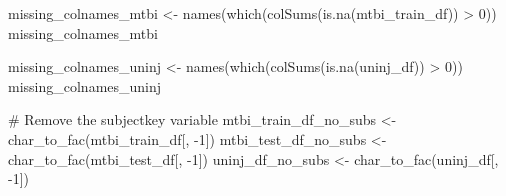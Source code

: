 \documentclass[
  letterpaper,
  DIV=11,
  numbers=noendperiod]{scrreprt}
\newenvironment{Shaded}{\begin{snugshade}}{\end{snugshade}}
\newcommand{\CommentTok}[1]{\textcolor[rgb]{0.37,0.37,0.37}{#1}}
\newcommand{\DecValTok}[1]{\textcolor[rgb]{0.68,0.00,0.00}{#1}}
\newcommand{\FunctionTok}[1]{\textcolor[rgb]{0.28,0.35,0.67}{#1}}
\newcommand{\NormalTok}[1]{\textcolor[rgb]{0.00,0.23,0.31}{#1}}
\newcommand{\OtherTok}[1]{\textcolor[rgb]{0.00,0.23,0.31}{#1}}
\newcommand{\SpecialCharTok}[1]{\textcolor[rgb]{0.37,0.37,0.37}{#1}}
\begin{document}
\begin{Shaded}
\begin{Highlighting}[]
\NormalTok{missing\_colnames\_mtbi }\OtherTok{\textless{}{-}} \FunctionTok{names}\NormalTok{(}\FunctionTok{which}\NormalTok{(}\FunctionTok{colSums}\NormalTok{(}\FunctionTok{is.na}\NormalTok{(mtbi\_train\_df)) }\SpecialCharTok{\textgreater{}} \DecValTok{0}\NormalTok{))}
\NormalTok{missing\_colnames\_mtbi}

\NormalTok{missing\_colnames\_uninj }\OtherTok{\textless{}{-}} \FunctionTok{names}\NormalTok{(}\FunctionTok{which}\NormalTok{(}\FunctionTok{colSums}\NormalTok{(}\FunctionTok{is.na}\NormalTok{(uninj\_df)) }\SpecialCharTok{\textgreater{}} \DecValTok{0}\NormalTok{))}
\NormalTok{missing\_colnames\_uninj}

\CommentTok{\# Remove the subjectkey variable}
\NormalTok{mtbi\_train\_df\_no\_subs }\OtherTok{\textless{}{-}} \FunctionTok{char\_to\_fac}\NormalTok{(mtbi\_train\_df[, }\SpecialCharTok{{-}}\DecValTok{1}\NormalTok{])}
\NormalTok{mtbi\_test\_df\_no\_subs }\OtherTok{\textless{}{-}} \FunctionTok{char\_to\_fac}\NormalTok{(mtbi\_test\_df[, }\SpecialCharTok{{-}}\DecValTok{1}\NormalTok{])}
\NormalTok{uninj\_df\_no\_subs }\OtherTok{\textless{}{-}} \FunctionTok{char\_to\_fac}\NormalTok{(uninj\_df[, }\SpecialCharTok{{-}}\DecValTok{1}\NormalTok{])}


\end{Highlighting}
\end{Shaded}
\end{document}
